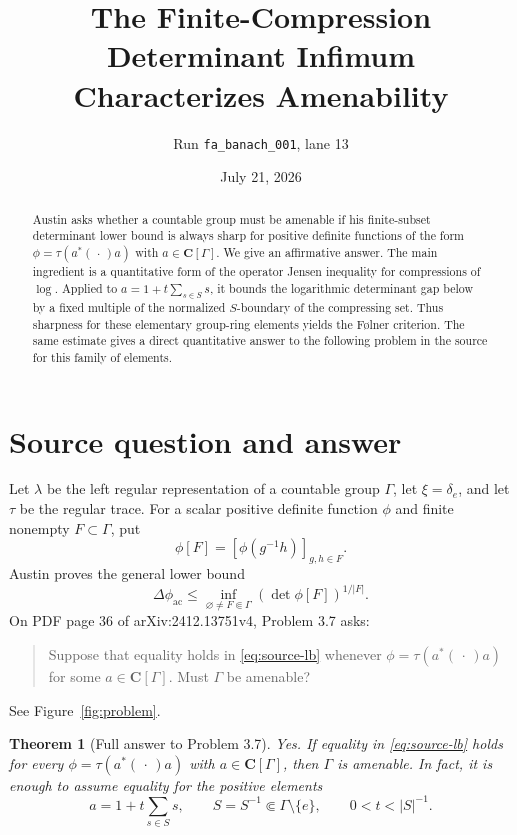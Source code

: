 \documentclass[11pt]{article}
\title{The Finite-Compression Determinant Infimum\\Characterizes Amenability}
\author{Run \texttt{fa\_banach\_001}, lane 13}
\date{July 21, 2026}
\newtheorem{theorem}{Theorem}
\newcommand{\G}{\Gamma}
\newcommand{\C}{\mathbf C}
\begin{document}
\maketitle

\begin{abstract}
Austin asks whether a countable group must be amenable if his finite-subset
determinant lower bound is always sharp for positive definite functions of
the form $\phi=\tau(a^*(\,\cdot\,)a)$ with $a\in\C[\G]$.  We give an
affirmative answer.  The main ingredient is a quantitative form of the
operator Jensen inequality for compressions of $\log$.  Applied to
$a=1+t\sum_{s\in S}s$, it bounds the logarithmic determinant gap below by a
fixed multiple of the normalized $S$-boundary of the compressing set.  Thus
sharpness for these elementary group-ring elements yields the F\o lner
criterion.  The same estimate gives a direct quantitative answer to the
following problem in the source for this family of elements.
\end{abstract}

\section{Source question and answer}

Let $\lambda$ be the left regular representation of a countable group $\G$,
let $\xi=\delta_e$, and let $\tau$ be the regular trace.  For a scalar
positive definite function $\phi$ and finite nonempty $F\subset\G$, put
\[
 \phi[F]=[\phi(g^{-1}h)]_{g,h\in F}.
\]
Austin proves the general lower bound
\begin{equation}\label{eq:source-lb}
 \Delta\phi_{\mathrm{ac}}
 \leq \inf_{\varnothing\ne F\Subset\G}
          (\det\phi[F])^{1/|F|}.
\end{equation}
On PDF page 36 of arXiv:2412.13751v4, Problem 3.7 asks:
\begin{quote}
Suppose that equality holds in \eqref{eq:source-lb} whenever
$\phi=\tau(a^*(\,\cdot\,)a)$ for some $a\in\C[\G]$.
Must $\G$ be amenable?
\end{quote}
See Figure~\ref{fig:problem}.

\begin{theorem}[Full answer to Problem 3.7]\label{thm:main}
Yes.  If equality in \eqref{eq:source-lb} holds for every
$\phi=\tau(a^*(\,\cdot\,)a)$ with $a\in\C[\G]$, then $\G$ is amenable.
In fact, it is enough to assume equality for the positive elements
\[
 a=1+t\sum_{s\in S}s,
 \qquad S=S^{-1}\Subset\G\setminus\{e\},\qquad 0<t<|S|^{-1}.
\]
\end{theorem}
\end{document}
